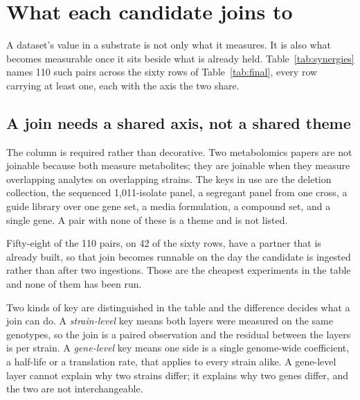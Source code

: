 
\section{What each candidate joins to}\label{sec:synergies}

A dataset's value in a substrate is not only what it measures. It is also what becomes
measurable once it sits beside what is already held. Table~\ref{tab:synergies} names 110
such pairs across the sixty rows of Table~\ref{tab:final}, every row carrying at least one, each with the axis the two share.

\subsection{A join needs a shared axis, not a shared theme}

The  column is required rather than decorative. Two metabolomics papers are
not joinable because both measure metabolites; they are joinable when they measure
overlapping analytes on overlapping strains. The keys in use are the deletion collection,
the sequenced 1,011-isolate panel, a segregant panel from one cross, a guide library over
one gene set, a media formulation, a compound set, and a single gene. A pair with none of
these is a theme and is not listed.

Fifty-eight of the 110 pairs, on 42 of the sixty rows, have a partner that is already built, so that join becomes
runnable on the day the candidate is ingested rather than after two ingestions. Those are
the cheapest experiments in the table and none of them has been run.

Two kinds of key are distinguished in the table and the difference decides what a join can
do. A \emph{strain-level} key means both layers were measured on the same genotypes, so
the join is a paired observation and the residual between the layers is per strain. A
\emph{gene-level} key means one side is a single genome-wide coefficient, a half-life or a
translation rate, that applies to every strain alike. A gene-level layer cannot explain why
two strains differ; it explains why two genes differ, and the two are not interchangeable.

